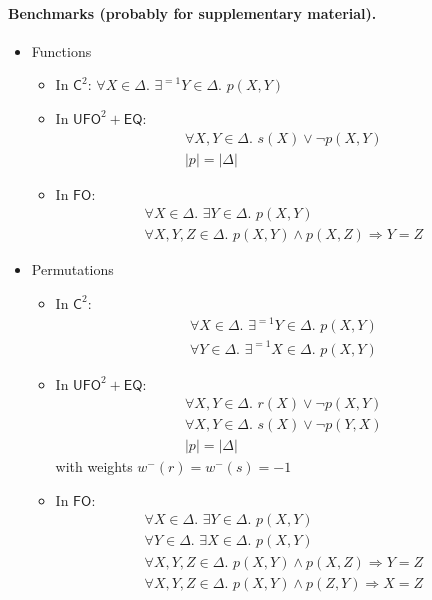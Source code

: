 \documentclass{article}
\newcommand{\Ctwo}{$\mathsf{C}^{2}$}
\newcommand{\FO}{$\mathsf{FO}$}
\newcommand{\UFO}{$\mathsf{UFO}^{2} + \mathsf{EQ}$}
\begin{document}
\paragraph{Benchmarks (probably for supplementary material).}
\begin{itemize}
  \item Functions
        \begin{itemize}
          \item In \Ctwo: $\forall X \in \Delta\text{.
                }\exists^{=1} Y \in \Delta\text{. }p(X, Y)$
          \item In \UFO:
                \begin{gather*}
                  \forall X, Y \in \Delta\text{. } s(X) \lor \neg p(X, Y)\\
                  |p| = |\Delta|
                \end{gather*}
          \item In \FO:
                \begin{gather*}
                  \forall X \in \Delta\text{. }\exists Y \in \Delta\text{. } p(X, Y)\\
                  \forall X, Y, Z \in \Delta\text{. } p(X, Y) \land p(X, Z) \Rightarrow Y = Z
                \end{gather*}
        \end{itemize}
  \item Permutations
        \begin{itemize}
          \item In \Ctwo:
                \begin{gather*}
                  \forall X \in \Delta\text{. }\exists^{=1} Y \in \Delta\text{. }p(X, Y)\\
                  \forall Y \in \Delta\text{. }\exists^{=1} X \in \Delta\text{. }p(X, Y)
                \end{gather*}
          \item In \UFO:
                \begin{gather*}
                  \forall X, Y \in \Delta\text{. } r(X) \lor \neg p(X, Y)\\
                  \forall X, Y \in \Delta\text{. } s(X) \lor \neg p(Y, X)\\
                  |p| = |\Delta|
                \end{gather*}
                with weights $w^{-}(r) = w^{-}(s) = -1$
          \item In \FO:
                \begin{gather*}
                  \forall X \in \Delta\text{. }\exists Y \in \Delta\text{. } p(X, Y)\\
                  \forall Y \in \Delta\text{. }\exists X \in \Delta\text{. } p(X, Y)\\
                  \forall X, Y, Z \in \Delta\text{. } p(X, Y) \land p(X, Z) \Rightarrow Y = Z\\
                  \forall X, Y, Z \in \Delta\text{. } p(X, Y) \land p(Z, Y) \Rightarrow X = Z
                \end{gather*}
        \end{itemize}
\end{itemize}
\end{document}
